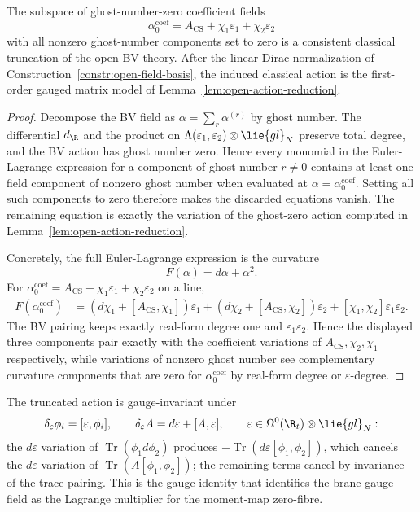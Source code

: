 \documentclass[11pt]{memoir}
\begin{document}
\begin{prop}\label{prop:open-bv-truncation}
  The subspace of ghost-number-zero coefficient fields
  $$\alpha_0^{\mathrm{coef}}
    =A_{\mathrm{CS}}+\chi_1\varepsilon_1+\chi_2\varepsilon_2$$
  with all nonzero ghost-number components set to zero is a consistent
  classical truncation of the open BV theory. After the linear
  Dirac-normalization of Construction~\ref{constr:open-field-basis},
  the induced classical action is the first-order gauged matrix model of
  Lemma~\ref{lem:open-action-reduction}.
\end{prop}

\begin{proof}
  Decompose the BV field as $\alpha=\sum_r\alpha^{(r)}$ by ghost number. The
  differential $d_{\R}$ and the product on
  $\Lambda(\varepsilon_1,\varepsilon_2)\otimes\lie{gl}_N$ preserve total degree,
  and the BV action has ghost number zero. Hence every monomial in the
  Euler-Lagrange expression for a component of ghost number $r\neq0$ contains
  at least one field component of nonzero ghost number when evaluated at
  $\alpha=\alpha_0^{\mathrm{coef}}$. Setting all such components to zero
  therefore makes the discarded equations vanish. The remaining equation is
  exactly the variation of the ghost-zero action computed in
  Lemma~\ref{lem:open-action-reduction}.

  Concretely, the full Euler-Lagrange expression is the curvature
  $$F(\alpha)=d\alpha+\alpha^2.$$
  For
  \(\alpha_0^{\mathrm{coef}}
    =A_{\mathrm{CS}}+\chi_1\varepsilon_1+\chi_2\varepsilon_2\) on a line,
  \begin{align*}
  F(\alpha_0^{\mathrm{coef}})
    &=(d\chi_1+[A_{\mathrm{CS}},\chi_1])\varepsilon_1
      +(d\chi_2+[A_{\mathrm{CS}},\chi_2])\varepsilon_2
      +[\chi_1,\chi_2]\varepsilon_1\varepsilon_2.
  \end{align*}
  The BV pairing keeps exactly real-form degree one and
  $\varepsilon_1\varepsilon_2$. Hence the displayed three components pair exactly
  with the coefficient variations of \(A_{\mathrm{CS}},\chi_2,\chi_1\)
  respectively, while variations of
  nonzero ghost number see complementary curvature components that are zero for
  \(\alpha_0^{\mathrm{coef}}\) by real-form degree or
  \(\varepsilon\)-degree.
\end{proof}

The truncated action is gauge-invariant under
\[
  \delta_\varepsilon\phi_i=[\varepsilon,\phi_i],\qquad
  \delta_\varepsilon A=d\varepsilon+[A,\varepsilon],\qquad
  \varepsilon\in\Omega^0(\R_t)\otimes\lie{gl}_N:
\]
the \(d\varepsilon\) variation of
\(\operatorname{Tr}(\phi_1d\phi_2)\) produces
\(-\operatorname{Tr}(d\varepsilon[\phi_1,\phi_2])\), which cancels the
\(d\varepsilon\) variation of
\(\operatorname{Tr}(A[\phi_1,\phi_2])\); the remaining terms cancel by
invariance of the trace pairing. This is the gauge identity that
identifies the brane gauge field as the Lagrange multiplier for the
moment-map zero-fibre.
\end{document}
